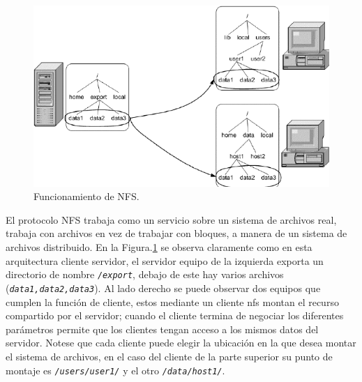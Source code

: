 \documentclass[letterpaper, 12pt, oneside]{article}
\begin{document}
    \begin{figure}[H]
    \includegraphics[scale=0.7]{img/nfs/nfs.png}
    \caption{Funcionamiento de NFS.}
        \label{fig:nfs1}
    \end{figure}
    El protocolo NFS trabaja como un servicio sobre un sistema de archivos real, trabaja con archivos en vez de trabajar con bloques, a manera de un sistema de archivos distribuido. En la Figura.\ref{fig:nfs1} se observa claramente como en esta arquitectura cliente servidor, el servidor equipo de la izquierda exporta un directorio de nombre \texttt{\textit{\//export}}, debajo de este hay varios archivos (\texttt{\textit{data1,data2,data3}}). Al lado derecho se puede observar dos equipos que cumplen la función de cliente, estos mediante un cliente nfs montan el recurso compartido por el servidor; cuando el cliente termina de negociar los diferentes parámetros permite que los clientes tengan acceso a los mismos datos del servidor. Notese que cada cliente puede elegir la ubicación en la que desea montar el sistema de archivos, en el caso del cliente de la parte superior su punto de montaje es  \texttt{\textit{\//users/user1/}} y el otro \texttt{\textit{\//data/host1/}}.
    
\end{document}
